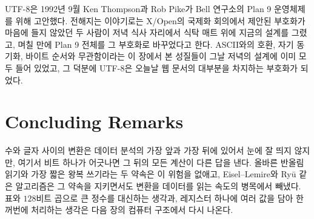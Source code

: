 \begin{aside}[식탁 위의 UTF-8]
UTF-8은 1992년 9월 Ken Thompson과 Rob Pike가 Bell 연구소의 Plan 9 운영체제를 위해 고안했다. 전해지는 이야기로는 X/Open의 국제화 회의에서 제안된 부호화가 마음에 들지 않았던 두 사람이 저녁 식사 자리에서 식탁 매트 위에 지금의 설계를 그렸고, 며칠 만에 Plan 9 전체를 그 부호화로 바꾸었다고 한다. ASCII와의 호환, 자기 동기화, 바이트 순서와 무관함이라는 이 장에서 본 성질들이 그날 저녁의 설계에 이미 모두 들어 있었고, 그 덕분에 UTF-8은 오늘날 웹 문서의 대부분을 차지하는 부호화가 되었다.
\end{aside}

\section{Concluding Remarks}

수와 글자 사이의 변환은 데이터 분석의 가장 앞과 가장 뒤에 있어서 눈에 잘 띄지 않지만, 여기서 비트 하나가 어긋나면 그 뒤의 모든 계산이 다른 답을 낸다. 올바른 반올림 읽기와 가장 짧은 왕복 쓰기라는 두 약속은 이 위험을 없애고, Eisel--Lemire와 Ryū 같은 알고리즘은 그 약속을 지키면서도 변환을 데이터를 읽는 속도의 병목에서 빼냈다. 표와 $128$비트 곱으로 큰 정수를 대신하는 생각과, 레지스터 하나에 여러 값을 담아 한꺼번에 처리하는 생각은 다음 장의 컴퓨터 구조에서 다시 나온다.

\chapterreferences
